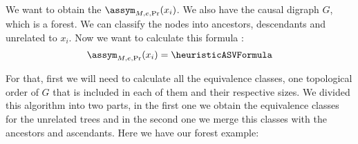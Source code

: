 We want to obtain the $\assym_{M,e,\Pr}(x_i)$. We also have the causal digraph $G$, which is a forest. We can classify the nodes into ancestors, descendants and unrelated to $x_i$. Now we want to calculate this formula : $$\assym_{M,e,\Pr}(x_i) = \heuristicASVFormula$$

For that, first we will need to calculate all the equivalence classes, one topological order of $G$ that is included in each of them and their respective sizes. We divided this algorithm into two parts, in the first one we obtain the equivalence classes for the unrelated trees and in the second one we merge this classes with the ancestors and ascendants. Here we have our forest example:

\newcommand{\drawUnrelatedTree}[4]{
    \node[unrelated] (#1) at (#2, #3) {#4};
     \pgfmathsetmacro{\x}{#2-2}
     \pgfmathsetmacro{\y}{#3-0.3} 
    \draw[red, wiggly] (#2, \y)
        -- ++(-1,-1.6) 
        -- ++(2,0) 
        -- cycle;
    \node[text=red] at (\x, \y) {#4 subtree};
}

